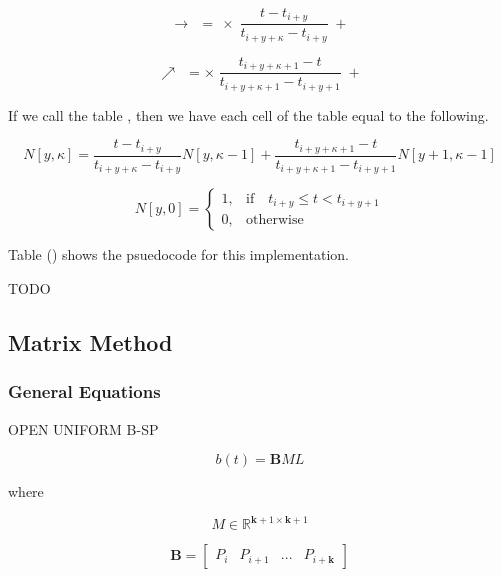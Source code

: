 \documentclass{article}
\begin{document}
\begin{equation}
    \rightarrow \:\: = \: \times \; \frac{t - t_{i+y}}{t_{i+y+\kappa} - t_{i+y}} \; + 
\end{equation}

\begin{equation}
    \nearrow \:\:  = \times \; \frac{t_{i+y+\kappa+1} - t}{t_{i+y+\kappa+1}-t_{i+y+1}} \; + 
\end{equation}

If we call the table , then we have each cell of the table equal to the following.

\begin{equation}
    N[y,\kappa] = \frac{t - t_{i+y}}{t_{i+y+\kappa} - t_{i+y}} N[y,\kappa-1] + \frac{t_{i+y+\kappa+1} - t}{t_{i+y+\kappa+1}-t_{i+y+1}} N[y+1,\kappa-1]
\end{equation}

\begin{equation} \label{eq:Basis function equation zeros}
      N[y,0] =   \begin{cases} 1, &  \text{if} \quad t_{i+y} \leq t < t_{i+y+1} \\
                            0, & \text{otherwise} \end{cases}
  \end{equation}
  
 Table () shows the psuedocode for this implementation.
 
 TODO

\subsection{Matrix Method}
    \subsubsection{General Equations}
    
OPEN UNIFORM B-SP\GammaINES
\hfill \break
    
    \begin{equation}
        b(t) = \textbf{B} M L
    \end{equation}

        where
    
    \begin{equation}
    M \in \mathbb{R}^{\textbf{k}+1 \times \textbf{k}+1}
    \end{equation}
        
    \begin{equation}
        \textbf{B} = \begin{bmatrix} P_{i} & P_{i+1} & ... & P_{i+\textbf{k}}\end{bmatrix}
    \end{equation}
    
\end{document}
